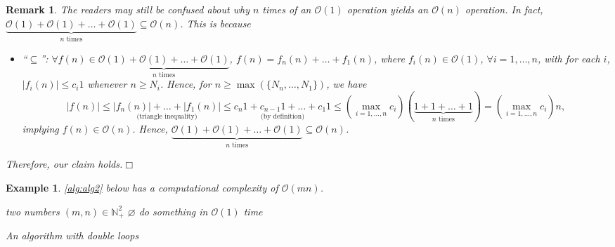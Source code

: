 \documentclass[twoside]{article}
\newcommand{\qedwhite}{\hfill \ensuremath{\Box}}
\newcommand{\abs}[1]{\left\lvert#1\right\rvert}
\newtheorem{remark}[theorem]{Remark}
\newtheorem{example}[theorem]{Example}
\begin{document}
\begin{remark}\normalfont
    The readers may still be confused about why $n$ times of an $\mathcal{O}(1)$ operation yields an $\mathcal{O}(n)$ operation. In fact, $\underbrace{\mathcal{O}(1)+\mathcal{O}(1)+\ldots+\mathcal{O}(1)}_{n\text{~times}}\subseteq\mathcal{O}(n)$. This is because
    \begin{itemize}[leftmargin=*]
        \item ``$\subseteq$'': $\forall f(n)\in\underbrace{\mathcal{O}(1)+\mathcal{O}(1)+\ldots+\mathcal{O}(1)}_{n\text{~times}}$, $f(n)=f_{n}(n)+\ldots+f_{1}(n)$, where $f_{i}(n)\in\mathcal{O}(1)$, $\forall i=1,\ldots,n$, with for each $i$, $\abs{f_{i}(n)}\leq c_{i}1$ whenever $n\geq N_{i}$. Hence, for $n\geq\max(\{N_{n},\ldots,N_{1}\})$, we have
        \begin{equation*}
        \abs{f(n)}\leq \underset{\text{(triangle inequality)}}{\abs{f_{n}(n)}+\ldots+\abs{f_{1}(n)}} \leq \underset{\text{(by definition)}}{c_{n}1+c_{n-1}1+\ldots+c_{1}1}\leq\left(\max_{i=1,\ldots,n}c_{i}\right)\left(\underbrace{1+1+\ldots+1}_{n\text{~times}}\right)=\left(\max_{i=1,\ldots,n}c_{i}\right)n,
        \end{equation*}
        implying $f(n)\in\mathcal{O}(n)$. Hence, $\underbrace{\mathcal{O}(1)+\mathcal{O}(1)+\ldots+\mathcal{O}(1)}_{n\text{~times}}\subseteq\mathcal{O}(n)$.
        
    \end{itemize}
    Therefore, our claim holds.\qedwhite
\end{remark}
\newpage
\begin{example}\normalfont
    \autoref{alg:alg2} below has a computational complexity of $\mathcal{O}(mn)$.
    
\begin{algorithm}[!ht]
\begin{algorithmic}[1]
\REQUIRE two numbers $(m,n)\in\mathbb{N}_{+}^{2}$
\ENSURE $\varnothing$
\STATE do something in $\mathcal{O}(1)$ time
\ENDFOR
\ENDFOR
\end{algorithmic}
\caption{An algorithm with double loops}
\label{alg:alg2}
\end{algorithm}

\end{example}
\end{document}
